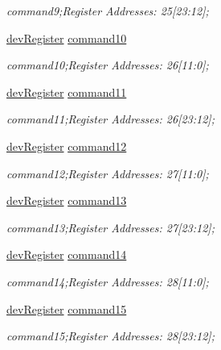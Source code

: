 \begin{DoxyCompactItemize}
\begin{DoxyCompactList}\small\item\em command9;Register Addresses\+: 25\mbox{[}23\+:12\mbox{]}; \end{DoxyCompactList}\item 
\mbox{\hyperlink{classdev_register}{dev\+Register}} \mbox{\hyperlink{class_o_p_t3101_registers_a331f6fdaebe58dcd6c2e3877eee80e13}{command10}}
\begin{DoxyCompactList}\small\item\em command10;Register Addresses\+: 26\mbox{[}11\+:0\mbox{]}; \end{DoxyCompactList}\item 
\mbox{\hyperlink{classdev_register}{dev\+Register}} \mbox{\hyperlink{class_o_p_t3101_registers_a79da1f886e7e9c510887ed3f75e719e6}{command11}}
\begin{DoxyCompactList}\small\item\em command11;Register Addresses\+: 26\mbox{[}23\+:12\mbox{]}; \end{DoxyCompactList}\item 
\mbox{\hyperlink{classdev_register}{dev\+Register}} \mbox{\hyperlink{class_o_p_t3101_registers_a9fe700368c3c4de51684f63652e02b18}{command12}}
\begin{DoxyCompactList}\small\item\em command12;Register Addresses\+: 27\mbox{[}11\+:0\mbox{]}; \end{DoxyCompactList}\item 
\mbox{\hyperlink{classdev_register}{dev\+Register}} \mbox{\hyperlink{class_o_p_t3101_registers_a5b3ba31ab480cef6c4d6cafcb3ea67d6}{command13}}
\begin{DoxyCompactList}\small\item\em command13;Register Addresses\+: 27\mbox{[}23\+:12\mbox{]}; \end{DoxyCompactList}\item 
\mbox{\hyperlink{classdev_register}{dev\+Register}} \mbox{\hyperlink{class_o_p_t3101_registers_abdd02aba9d572fb7391756d3f07cd07c}{command14}}
\begin{DoxyCompactList}\small\item\em command14;Register Addresses\+: 28\mbox{[}11\+:0\mbox{]}; \end{DoxyCompactList}\item 
\mbox{\hyperlink{classdev_register}{dev\+Register}} \mbox{\hyperlink{class_o_p_t3101_registers_ab271fc67300955f3e8fb05e7380e77ee}{command15}}
\begin{DoxyCompactList}\small\item\em command15;Register Addresses\+: 28\mbox{[}23\+:12\mbox{]}; \end{DoxyCompactList}\item 

\end{DoxyCompactItemize}
